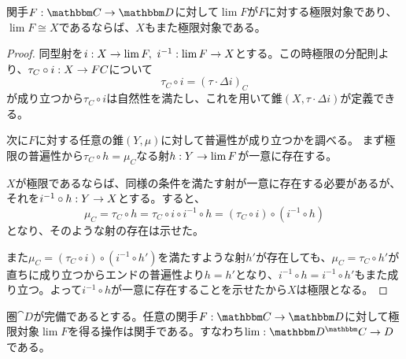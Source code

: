 \begin{prop}[同型の極限の保存]
  関手$\functor{F}{C}{D}$に対して$\lim F$が$F$に対する極限対象であり、$\lim F\cong X$であるならば、$X$もまた極限対象である。
\end{prop}
\begin{proof}
  同型射を$i:X\rightarrow \lim F,\ i^{-1}:\lim F\rightarrow X$とする。この時極限の分配則より、$\tau_C\circ i:X\rightarrow FC$について\[\tau_C\circ i = (\tau\cdot\varDelta i)_C\]が成り立つから$\tau_C\circ i$は自然性を満たし、これを用いて錐$(X,\tau\cdot\varDelta i)$が定義できる。

  次に$F$に対する任意の錐$(Y,\mu)$に対して普遍性が成り立つかを調べる。
  まず極限の普遍性から$\tau_C\circ h = \mu_C$なる射$h:Y\rightarrow \lim F$が一意に存在する。

  $X$が極限であるならば、同様の条件を満たす射が一意に存在する必要があるが、それを$i^{-1}\circ h:Y\rightarrow X$とする。すると、
  \[\mu_C=\tau_C\circ h = \tau_C\circ i\circ i^{-1}\circ h =(\tau_C\circ i)\circ (i^{-1}\circ h)\]となり、そのような射の存在は示せた。
  \begin{center}
  \end{center}
  また$\mu_C =(\tau_C\circ i)\circ (i^{-1}\circ h')$を満たすような射$h'$が存在しても、$\mu_C=\tau_C\circ h'$が直ちに成り立つからエンドの普遍性より$h=h'$となり、$i^{-1}\circ h=i^{-1}\circ h'$もまた成り立つ。よって$i^{-1}\circ h$が一意に存在することを示せたから$X$は極限となる。
\end{proof}
\begin{prop}[極限の関手性]\label{prop-limit-is-functor}
  圏$\cat{D}$が完備であるとする。任意の関手$\functor{F}{C}{D}$に対して極限対象$\lim F$を得る操作は関手である。すなわち$\mor{\lim}{\funccat{C}{D}}{D}$である。
\end{prop}
